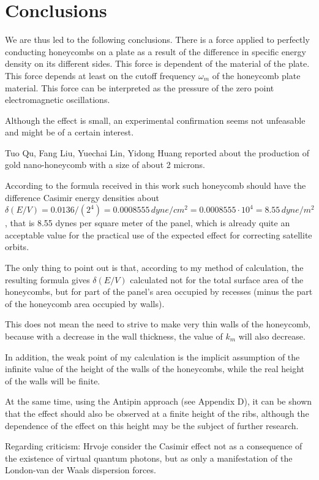 \documentclass[11pt]{article}
\begin{document}
    \section{Conclusions}\label{conclusions}

    We are thus led to the following conclusions. There is a force applied
to perfectly conducting honeycombs on a plate as a result of the
difference in specific energy density on its different sides. This force
is dependent of the material of the plate. This force depends at least
on the cutoff frequency \(\omega_m\) of the honeycomb plate material.
This force can be interpreted as the pressure of the zero point
electromagnetic oscillations.

    Although the effect is small, an experimental confirmation seems not
unfeasable and might be of a certain interest.

    Tuo Qu, Fang Liu, Yuechai Lin, Yidong Huang \cite{Tuo2019} reported
about the production of gold nano-honeycomb with a size of about 2
microns.

According to the formula received in this work such honeycomb should
have the difference Casimir energy densities about
\(\delta\left(E/V\right) = 0.0136/({2^4}) = 0.0008555\,dyne/cm^2 = 0.0008555 \cdot 10^4 = 8.55\,dyne/m^2\),
that is 8.55 dynes per square meter of the panel, which is already quite
an acceptable value for the practical use of the expected effect for
correcting satellite orbits.

The only thing to point out is that, according to my method of
calculation, the resulting formula gives \(\delta\left(E/V\right)\)
calculated not for the total surface area of the honeycombs, but for
part of the panel's area occupied by recesses (minus the part of the
honeycomb area occupied by walls).

This does not mean the need to strive to make very thin walls of the
honeycomb, because with a decrease in the wall thickness, the value of
\(k_m\) will also decrease.

In addition, the weak point of my calculation is the implicit assumption
of the infinite value of the height of the walls of the honeycombs,
while the real height of the walls will be finite.

At the same time, using the Antipin approach (see Appendix D), it can be
shown that the effect should also be observed at a finite height of the
ribs, although the dependence of the effect on this height may be the
subject of further research.

Regarding criticism: Hrvoje \cite{Hrvoje2016} consider the Casimir
effect not as a consequence of the existence of virtual quantum photons,
but as only a manifestation of the London-van der Waals dispersion
forces.
\end{document}
